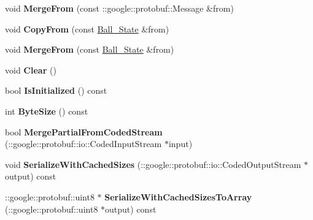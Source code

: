 \begin{DoxyCompactItemize}
\item 
\hypertarget{classvss__state_1_1Ball__State_a23b0aa5fb0ead3fa0eb1d49f044a4108}{void {\bfseries Merge\-From} (const \-::google\-::protobuf\-::\-Message \&from)}\label{classvss__state_1_1Ball__State_a23b0aa5fb0ead3fa0eb1d49f044a4108}

\item 
\hypertarget{classvss__state_1_1Ball__State_abc6d9bde7cd19d33f5592fe7e89958f2}{void {\bfseries Copy\-From} (const \hyperlink{classvss__state_1_1Ball__State}{Ball\-\_\-\-State} \&from)}\label{classvss__state_1_1Ball__State_abc6d9bde7cd19d33f5592fe7e89958f2}

\item 
\hypertarget{classvss__state_1_1Ball__State_a6c0a4da68998dea51ba4971d3f3ae758}{void {\bfseries Merge\-From} (const \hyperlink{classvss__state_1_1Ball__State}{Ball\-\_\-\-State} \&from)}\label{classvss__state_1_1Ball__State_a6c0a4da68998dea51ba4971d3f3ae758}

\item 
\hypertarget{classvss__state_1_1Ball__State_a23083679f69714534dff6d2fa4dfd69c}{void {\bfseries Clear} ()}\label{classvss__state_1_1Ball__State_a23083679f69714534dff6d2fa4dfd69c}

\item 
\hypertarget{classvss__state_1_1Ball__State_a86118bd22017a79d8bcecbb9759664ae}{bool {\bfseries Is\-Initialized} () const }\label{classvss__state_1_1Ball__State_a86118bd22017a79d8bcecbb9759664ae}

\item 
\hypertarget{classvss__state_1_1Ball__State_a37464e62ecce865fa9b7d71df18a6df2}{int {\bfseries Byte\-Size} () const }\label{classvss__state_1_1Ball__State_a37464e62ecce865fa9b7d71df18a6df2}

\item 
\hypertarget{classvss__state_1_1Ball__State_a23384562e9b1779b7eae6df07fec8c08}{bool {\bfseries Merge\-Partial\-From\-Coded\-Stream} (\-::google\-::protobuf\-::io\-::\-Coded\-Input\-Stream $\ast$input)}\label{classvss__state_1_1Ball__State_a23384562e9b1779b7eae6df07fec8c08}

\item 
\hypertarget{classvss__state_1_1Ball__State_ac9561ed1c347cc216c9adda156c8b1a7}{void {\bfseries Serialize\-With\-Cached\-Sizes} (\-::google\-::protobuf\-::io\-::\-Coded\-Output\-Stream $\ast$output) const }\label{classvss__state_1_1Ball__State_ac9561ed1c347cc216c9adda156c8b1a7}

\item 
\hypertarget{classvss__state_1_1Ball__State_a2db6bbee44c417e395cc2b707bbab23c}{\-::google\-::protobuf\-::uint8 $\ast$ {\bfseries Serialize\-With\-Cached\-Sizes\-To\-Array} (\-::google\-::protobuf\-::uint8 $\ast$output) const }\label{classvss__state_1_1Ball__State_a2db6bbee44c417e395cc2b707bbab23c}


\end{DoxyCompactItemize}
